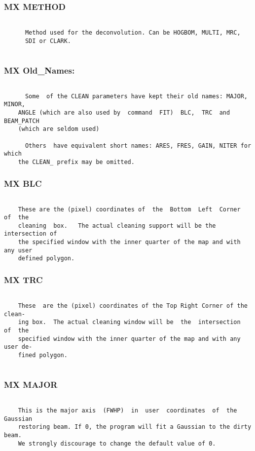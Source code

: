 \subsubsection{MX METHOD}
\begin{verbatim}

      Method used for the deconvolution. Can be HOGBOM, MULTI, MRC,
      SDI or CLARK.


\end{verbatim}
\subsubsection{MX Old\_Names:}
\begin{verbatim}

      Some  of the CLEAN parameters have kept their old names: MAJOR, MINOR,
    ANGLE (which are also used by  command  FIT)  BLC,  TRC  and  BEAM_PATCH
    (which are seldom used)

      Others  have equivalent short names: ARES, FRES, GAIN, NITER for which
    the CLEAN_ prefix may be omitted.

\end{verbatim}
\subsubsection{MX BLC}
\begin{verbatim}

    These are the (pixel) coordinates of  the  Bottom  Left  Corner  of  the
    cleaning  box.   The actual cleaning support will be the intersection of
    the specified window with the inner quarter of the map and with any user
    defined polygon.

\end{verbatim}
\subsubsection{MX TRC}
\begin{verbatim}

    These  are the (pixel) coordinates of the Top Right Corner of the clean-
    ing box.  The actual cleaning window will be  the  intersection  of  the
    specified window with the inner quarter of the map and with any user de-
    fined polygon.


\end{verbatim}
\subsubsection{MX MAJOR}
\begin{verbatim}

    This is the major axis  (FWHP)  in  user  coordinates  of  the  Gaussian
    restoring beam. If 0, the program will fit a Gaussian to the dirty beam.
    We strongly discourage to change the default value of 0.

\end{verbatim}
